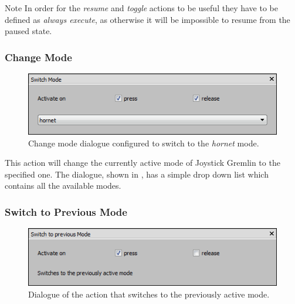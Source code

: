 \documentclass[a4, 10pt]{article}
\newcommand{\JG}{Joystick Gremlin}
\begin{document}
\vspace{1em}
\begin{bclogo}[
    couleur=yellow!40,
    couleurBord=orange!80,
    couleurBarre=orange!80,
    arrondi=0.1,
    logo=\bcinfo
]{Note}
    In order for the \emph{resume} and \emph{toggle} actions to be
    useful they have to be defined as \emph{always execute}, as
    otherwise it will be impossible to resume from the paused state.
\end{bclogo}


\subsubsection{Change Mode}

\begin{figure}[bt]
    \centering

    \includegraphics[width=0.75\linewidth]{images/action_switch_mode}
    \caption{Change mode dialogue configured to switch to the
        \emph{hornet} mode.}
    \label{fig:action_change_mode}
\end{figure}

This action will change the currently active mode of \JG{} to the
specified one. The dialogue, shown in , has
a simple drop down list which contains all the available modes.


\subsubsection{Switch to Previous Mode}

\begin{figure}[bt]
    \centering

    \includegraphics[width=0.75\linewidth]{images/action_switch_previous_mode}
    \caption{Dialogue of the action that switches to the previously
    active mode.}
    \label{fig:action_previous_mode}
\end{figure}
\end{document}
